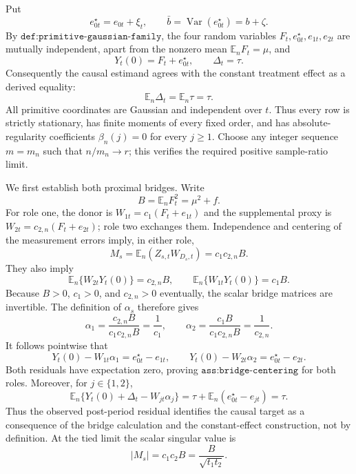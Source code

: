 Put
\[
 e_{0t}^{\star}=e_{0t}+\xi_t,
 \qquad
 \bar b=\operatorname{Var}(e_{0t}^{\star})=b+\zeta.
\]
By \(\texttt{def:primitive-gaussian-family}\), the four random variables \(F_t,e_{0t}^{\star},e_{1t},e_{2t}\) are mutually independent, apart from the nonzero mean \(\mathbb E_nF_t=\mu\), and
\[
 Y_t(0)=F_t+e_{0t}^{\star},
 \qquad
 \Delta_t=\tau.
\]
Consequently the causal estimand agrees with the constant treatment effect as a derived equality:
\[
 \mathbb E_n\Delta_t=\mathbb E_n\tau=\tau.
\]
All primitive coordinates are Gaussian and independent over \(t\).  Thus every row is strictly stationary, has finite moments of every fixed order, and has absolute-regularity coefficients \(\beta_n(j)=0\) for every \(j\geq1\).  Choose any integer sequence \(m=m_n\) such that \(n/m_n\to r\); this verifies the required positive sample-ratio limit.

We first establish both proximal bridges.  Write
\[
 B=\mathbb E_nF_t^2=\mu^2+f.
\]
For role one, the donor is \(W_{1t}=c_1(F_t+e_{1t})\) and the supplemental proxy is \(W_{2t}=c_{2,n}(F_t+e_{2t})\); role two exchanges them.  Independence and centering of the measurement errors imply, in either role,
\[
 M_s=\mathbb E_n(Z_{s,t}W_{D_s,t})=c_1c_{2,n}B.
\]
They also imply
\[
 \mathbb E_n\{W_{2t}Y_t(0)\}=c_{2,n}B,
 \qquad
 \mathbb E_n\{W_{1t}Y_t(0)\}=c_1B.
\]
Because \(B>0\), \(c_1>0\), and \(c_{2,n}>0\) eventually, the scalar bridge matrices are invertible.  The definition of \(\alpha_s\) therefore gives
\[
 \alpha_1=\frac{c_{2,n}B}{c_1c_{2,n}B}=\frac1{c_1},
 \qquad
 \alpha_2=\frac{c_1B}{c_1c_{2,n}B}=\frac1{c_{2,n}}.
\]
It follows pointwise that
\[
 Y_t(0)-W_{1t}\alpha_1=e_{0t}^{\star}-e_{1t},
 \qquad
 Y_t(0)-W_{2t}\alpha_2=e_{0t}^{\star}-e_{2t}.
\]
Both residuals have expectation zero, proving \(\texttt{ass:bridge-centering}\) for both roles.  Moreover, for \(j\in\{1,2\}\),
\[
 \mathbb E_n\{Y_t(0)+\Delta_t-W_{jt}\alpha_j\}
 =\tau+\mathbb E_n(e_{0t}^{\star}-e_{jt})
 =\tau.
\]
Thus the observed post-period residual identifies the causal target as a consequence of the bridge calculation and the constant-effect construction, not by definition.  At the tied limit the scalar singular value is
\[
 |M_s|=c_1c_2B=\frac{B}{\sqrt{t_1t_2}}.
\]

